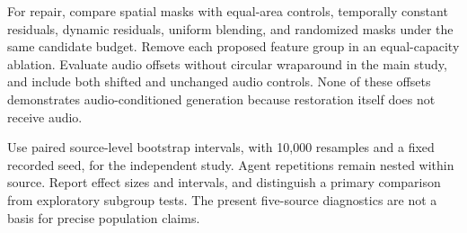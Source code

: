 For repair, compare spatial masks with equal-area controls, temporally constant residuals, dynamic residuals, uniform blending, and randomized masks under the same candidate budget. Remove each proposed feature group in an equal-capacity ablation. Evaluate audio offsets without circular wraparound in the main study, and include both shifted and unchanged audio controls. None of these offsets demonstrates audio-conditioned generation because restoration itself does not receive audio.

Use paired source-level bootstrap intervals, with 10,000 resamples and a fixed recorded seed, for the independent study. Agent repetitions remain nested within source. Report effect sizes and intervals, and distinguish a primary comparison from exploratory subgroup tests. The present five-source diagnostics are not a basis for precise population claims. 

\begin{table}[t]
\centering\small
\caption{Independent-test comparison. Unrun experiments are marked pending. Report source-macro estimates with 95\% source-level intervals. Error, introduced errors, and corrections use all eligible timestamps; agent risk is evaluated at common 75\% answer coverage, if supported by every compared policy. $\Delta$ scores are relative to captured video.}
\label{tab:main}
\setlength{\tabcolsep}{4pt}
\end{table}

